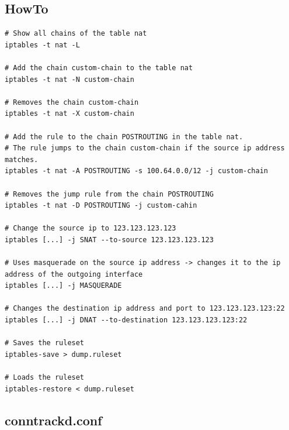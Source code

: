 \documentclass{report}
\begin{document}
\subsection{HowTo}

\begingroup
\fontsize{9pt}{9pt}\selectfont
\begin{verbatim}
# Show all chains of the table nat
iptables -t nat -L

# Add the chain custom-chain to the table nat
iptables -t nat -N custom-chain

# Removes the chain custom-chain
iptables -t nat -X custom-chain

# Add the rule to the chain POSTROUTING in the table nat.
# The rule jumps to the chain custom-chain if the source ip address matches.
iptables -t nat -A POSTROUTING -s 100.64.0.0/12 -j custom-chain

# Removes the jump rule from the chain POSTROUTING
iptables -t nat -D POSTROUTING -j custom-cahin

# Change the source ip to 123.123.123.123
iptables [...] -j SNAT --to-source 123.123.123.123

# Uses masquerade on the source ip address -> changes it to the ip address of the outgoing interface
iptables [...] -j MASQUERADE

# Changes the destination ip address and port to 123.123.123.123:22
iptables [...] -j DNAT --to-destination 123.123.123.123:22

# Saves the ruleset
iptables-save > dump.ruleset

# Loads the ruleset
iptables-restore < dump.ruleset
\end{verbatim}
\endgroup

\subsection{conntrackd.conf}\label{conntrackd.conf}
\end{document}
